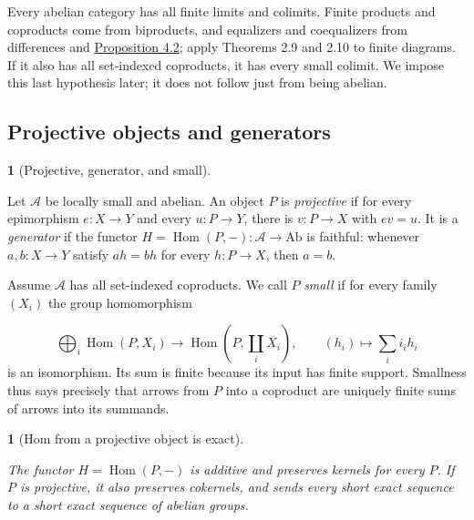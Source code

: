 \documentclass[11pt,a4paper]{article}
\newcommand{\mathheading}{}
\theoremstyle{plain}
\newtheorem*{plainstatement}{\mathheading}
\theoremstyle{definition}
\newtheorem*{definitionstatement}{\mathheading}
\newenvironment{mathstatement}[3]{\renewcommand{\mathheading}{#1 #2}\begin{plainstatement}[#3]}{\end{plainstatement}}
\newenvironment{mathdefinition}[3]{\renewcommand{\mathheading}{#1 #2}\begin{definitionstatement}[#3]}{\end{definitionstatement}}
\begin{document}
Every abelian category has all finite limits and colimits. Finite products and coproducts come from biproducts, and equalizers and coequalizers from differences and \hyperref[env-4-2]{Proposition 4.2}; apply Theorems 2.9 and 2.10 to finite diagrams. If it also has all set-indexed coproducts, it has every small colimit. We impose this last hypothesis later; it does not follow just from being abelian.


\subsection{Projective objects and generators}

\begin{mathdefinition}{Definition}{4.11}{Projective, generator, and small}
\label{env-4-11}

Let \(\mathcal A\) be locally small and abelian. An object \(P\) is \emph{projective} if for every epimorphism \(e:X\to Y\) and every \(u:P\to Y\), there is \(v:P\to X\) with \(ev=u\). It is a \emph{generator} if the functor \(H=\operatorname{Hom}(P,-):\mathcal A\to\mathrm{Ab}\) is faithful: whenever \(a,b:X\to Y\) satisfy \(ah=bh\) for every \(h:P\to X\), then \(a=b\).

 
Assume \(\mathcal A\) has all set-indexed coproducts. We call \(P\) \emph{small} if for every family \((X_i)\) the group homomorphism

\[\bigoplus_i\operatorname{Hom}(P,X_i)\longrightarrow\operatorname{Hom}(P,\coprod_iX_i),\qquad (h_i)\longmapsto\sum_i i_i h_i\] 
is an isomorphism. Its sum is finite because its input has finite support. Smallness thus says precisely that arrows from \(P\) into a coproduct are uniquely finite sums of arrows into its summands.


\par{}\par

\end{mathdefinition}
 
\begin{mathstatement}{Proposition}{4.12}{Hom from a projective object is exact}
\label{env-4-12}

The functor \(H=\operatorname{Hom}(P,-)\) is additive and preserves kernels for every \(P\). If \(P\) is projective, it also preserves cokernels, and sends every short exact sequence to a short exact sequence of abelian groups.


\par{}\par

\end{mathstatement}
 
\end{document}
